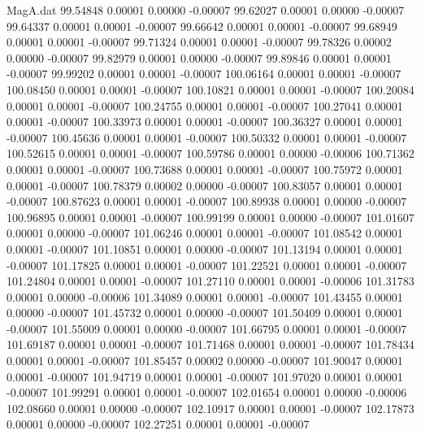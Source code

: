 \begin{filecontents}{MagA.dat}
  99.54848    0.00001    0.00000   -0.00007
  99.62027    0.00001    0.00000   -0.00007
  99.64337    0.00001    0.00001   -0.00007
  99.66642    0.00001    0.00001   -0.00007
  99.68949    0.00001    0.00001   -0.00007
  99.71324    0.00001    0.00001   -0.00007
  99.78326    0.00002    0.00000   -0.00007
  99.82979    0.00001    0.00000   -0.00007
  99.89846    0.00001    0.00001   -0.00007
  99.99202    0.00001    0.00001   -0.00007
 100.06164    0.00001    0.00001   -0.00007
 100.08450    0.00001    0.00001   -0.00007
 100.10821    0.00001    0.00001   -0.00007
 100.20084    0.00001    0.00001   -0.00007
 100.24755    0.00001    0.00001   -0.00007
 100.27041    0.00001    0.00001   -0.00007
 100.33973    0.00001    0.00001   -0.00007
 100.36327    0.00001    0.00001   -0.00007
 100.45636    0.00001    0.00001   -0.00007
 100.50332    0.00001    0.00001   -0.00007
 100.52615    0.00001    0.00001   -0.00007
 100.59786    0.00001    0.00000   -0.00006
 100.71362    0.00001    0.00001   -0.00007
 100.73688    0.00001    0.00001   -0.00007
 100.75972    0.00001    0.00001   -0.00007
 100.78379    0.00002    0.00000   -0.00007
 100.83057    0.00001    0.00001   -0.00007
 100.87623    0.00001    0.00001   -0.00007
 100.89938    0.00001    0.00000   -0.00007
 100.96895    0.00001    0.00001   -0.00007
 100.99199    0.00001    0.00000   -0.00007
 101.01607    0.00001    0.00000   -0.00007
 101.06246    0.00001    0.00001   -0.00007
 101.08542    0.00001    0.00001   -0.00007
 101.10851    0.00001    0.00000   -0.00007
 101.13194    0.00001    0.00001   -0.00007
 101.17825    0.00001    0.00001   -0.00007
 101.22521    0.00001    0.00001   -0.00007
 101.24804    0.00001    0.00001   -0.00007
 101.27110    0.00001    0.00001   -0.00006
 101.31783    0.00001    0.00000   -0.00006
 101.34089    0.00001    0.00001   -0.00007
 101.43455    0.00001    0.00000   -0.00007
 101.45732    0.00001    0.00000   -0.00007
 101.50409    0.00001    0.00001   -0.00007
 101.55009    0.00001    0.00000   -0.00007
 101.66795    0.00001    0.00001   -0.00007
 101.69187    0.00001    0.00001   -0.00007
 101.71468    0.00001    0.00001   -0.00007
 101.78434    0.00001    0.00001   -0.00007
 101.85457    0.00002    0.00000   -0.00007
 101.90047    0.00001    0.00001   -0.00007
 101.94719    0.00001    0.00001   -0.00007
 101.97020    0.00001    0.00001   -0.00007
 101.99291    0.00001    0.00001   -0.00007
 102.01654    0.00001    0.00000   -0.00006
 102.08660    0.00001    0.00000   -0.00007
 102.10917    0.00001    0.00001   -0.00007
 102.17873    0.00001    0.00000   -0.00007
 102.27251    0.00001    0.00001   -0.00007

\end{filecontents}
